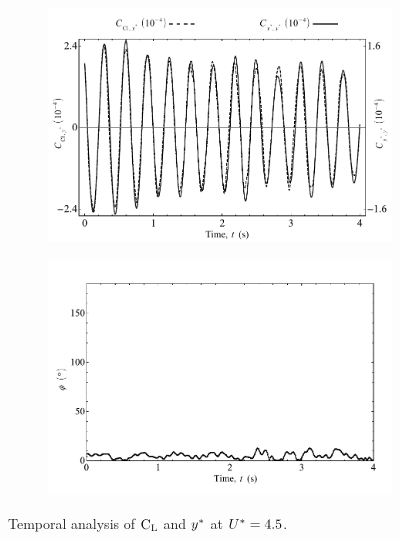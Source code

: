 \documentclass[oneside]{utmthesis}
\begin{document}
\begin{figure}
  \centering
  \begin{subfigure}[h]{1\textwidth}
    \includegraphics[width=\textwidth]{figs/tempAnalysisKVIV-a}
    \caption{}
    \label{fig:tempAnalysisKVIV-a}
  \end{subfigure}

  \begin{subfigure}[h]{1\textwidth}
    \includegraphics[width=\textwidth]{figs/tempAnalysisKVIV-b}
    \caption{}
    \label{fig:tempAnalysisKVIV-b}
  \end{subfigure}

  \caption{Temporal analysis of $\text{C}_{\text{L}}$ and $y^{*}$ at $U^{*} = 4.5$.}
\end{figure}
\end{document}
